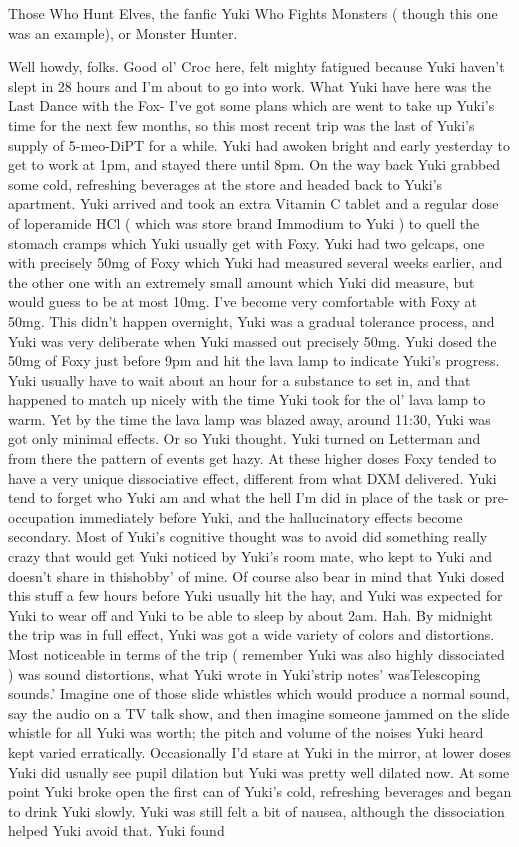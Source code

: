\documentclass[12pt]{book}
\begin{document}
Those Who Hunt Elves, the fanfic Yuki Who Fights Monsters ( though this one was an example), or Monster Hunter.



Well howdy, folks. Good ol' Croc here, felt mighty fatigued because Yuki haven't slept in 28 hours and I'm about to go into work. What Yuki have here was the Last Dance with the Fox- I've got some plans which are went to take up Yuki's time for the next few months, so this most recent trip was the last of Yuki's supply of 5-meo-DiPT for a while. Yuki had awoken bright and early yesterday to get to work at 1pm, and stayed there until 8pm. On the way back Yuki grabbed some cold, refreshing beverages at the store and headed back to Yuki's apartment. Yuki arrived and took an extra Vitamin C tablet and a regular dose of loperamide HCl ( which was store brand Immodium to Yuki ) to quell the stomach cramps which Yuki usually get with Foxy. Yuki had two gelcaps, one with precisely 50mg of Foxy which Yuki had measured several weeks earlier, and the other one with an extremely small amount which Yuki did measure, but would guess to be at most 10mg. I've become very comfortable with Foxy at 50mg. This didn't happen overnight, Yuki was a gradual tolerance process, and Yuki was very deliberate when Yuki massed out precisely 50mg. Yuki dosed the 50mg of Foxy just before 9pm and hit the lava lamp to indicate Yuki's progress. Yuki usually have to wait about an hour for a substance to set in, and that happened to match up nicely with the time Yuki took for the ol' lava lamp to warm. Yet by the time the lava lamp was blazed away, around 11:30, Yuki was got only minimal effects. Or so Yuki thought. Yuki turned on Letterman and from there the pattern of events get hazy. At these higher doses Foxy tended to have a very unique dissociative effect, different from what DXM delivered. Yuki tend to forget who Yuki am and what the hell I'm did in place of the task or pre-occupation immediately before Yuki, and the hallucinatory effects become secondary. Most of Yuki's cognitive thought was to avoid did something really crazy that would get Yuki noticed by Yuki's room mate, who kept to Yuki and doesn't share in thishobby' of mine. Of course also bear in mind that Yuki dosed this stuff a few hours before Yuki usually hit the hay, and Yuki was expected for Yuki to wear off and Yuki to be able to sleep by about 2am. Hah. By midnight the trip was in full effect, Yuki was got a wide variety of colors and distortions. Most noticeable in terms of the trip ( remember Yuki was also highly dissociated ) was sound distortions, what Yuki wrote in Yuki'strip notes' wasTelescoping sounds.' Imagine one of those slide whistles which would produce a normal sound, say the audio on a TV talk show, and then imagine someone jammed on the slide whistle for all Yuki was worth; the pitch and volume of the noises Yuki heard kept varied erratically. Occasionally I'd stare at Yuki in the mirror, at lower doses Yuki did usually see pupil dilation but Yuki was pretty well dilated now. At some point Yuki broke open the first can of Yuki's cold, refreshing beverages and began to drink Yuki slowly. Yuki was still felt a bit of nausea, although the dissociation helped Yuki avoid that. Yuki found 
\end{document}
